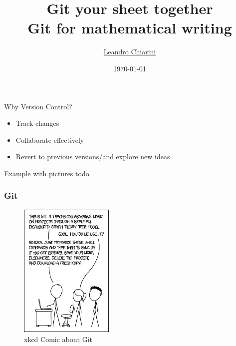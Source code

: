 \documentclass[12pt,t]{beamer}
\title{{\Huge Git your sheet together} \\ Git for mathematical writing}
\author{\href{http://lchiarini.com}{Leandro Chiarini}}
\institute{Durham University}
\date{\today \\
	\vspace{2em}
}
\def\red{\color{Red}}
\begin{document}
{
\frame{ \titlepage
   } }


\begin{frame}{Why Version Control?}
\begin{itemize}
		\pause
		\vspace{1em}
    \item Track changes 
		\pause
		\vspace{1em}
    \item Collaborate effectively 
		\pause
		\vspace{1em}
    \item Revert to previous versions/and explore new ideas
		\pause
\end{itemize}

\end{frame}

\begin{frame}{Example with pictures}
	{\red todo}
\end{frame} 

\begin{frame}\frametitle{Git}
%
\pause
\begin{figure}[ht]
    \centering
    \includegraphics[width=0.4\textwidth]{figs/git-xkcd-comic.png}
	\caption{xkcd Comic about Git}
\end{figure}
%
\end{frame}

\end{document}
